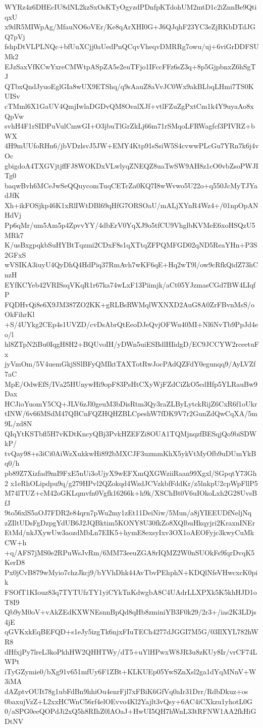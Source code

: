 WYRz4z6DHEcIU8dNL2kzSxOsKTyOgyzdPDnfpKTdohUM2mtD1c2iZnnBe9QtiqxU
x9dR5MIWpAg/MfauNO6oVEr/Ke8qArXHI0G+J6QJqhF23YC3eZjRKbDTdJGQ7pVj
fshpDtVLPLNQc+bfUuXCjj0aUedPnQCqvVheqvDMRRg7owu/uj+6viGrDDFSUMk2
EJzSaxVfKCwYxreCMWtpASpZA5e2euTFjo1IFccFFz6sZ3q+8p5GjpbnxZ6hSgTJ
QTbxQndJyuoEglGIa8wUX9ETShq/q9sAauZ8aVvJC0Wx9akBLbqLHmi7TS0KUISv
cTMml6X1GaUV4QmjIwlaDGDvQM8OealXJf+vtlFZuZgPxtCm1k4Y9uyaAo8xQpVw
svhH4F1rSIDPuVulCmwGI+O3jbuTlGrZkLj66m71rSMqoLFRWagfcf3PIVRZ+bWX
4H9mUUfoRHn6/jbVDzlsvJ5JW+EMY4Ktp91sSsiW5S4cvwwPLcGu7YRn7k6j4vOc
gbigdoA4TXGVjtjffFJ8WOKDxVLwlyqZNEQZ8uaTwSW9AH8z1cO0vbZsoPWJITg0
baqwBvh6MCeJwSeQQuycomTuqCETcZa0KQ7I8wWvwo5U22o+q550JcMyTJYadJfK
Xh+ikFOSjkp46K1xRlIWtDBl69qHfG7ORSOaU/mALjXYnR4Wz4+/01npOpANHdVj
Pp6qMr/um5Am5p4ZpvvYY/4dbErV0YqXJ9o5tfCU9VhglbKVMeE6xoHSQzU5MRk7
K/usBxgpqkbSuHYBtTqzmi2CDxF8s1qXTtqZFPQMFGD02qND5ReaYHn+P3S2GFxS
wVSIKA3iuyU4QyDhQ4HdPiq37RmAvh7wKF6qE+Hq2wT9l/ow9cRfkQidZ73hCnzH
EYfKCYeb42VRISsqVKqR1r67ka74wLxF13Piimjk/aCt05YJzmasCGd7BW4LIqfP
FQDHvQi8e6X9JM387ZO2KK+gRLBsRWMqlWXNXD2AuG8A0ZrFBvnMsS/oOkFihrKl
+S/4UYkg2CEp4s1UVZD/cvDsAbrQtEeoDJeQvjOFWu40MI+Nl6NvTb9PpJd4eo/l
hl8ZTpN2iBu0IqgH8H2+BQUvoIH/yDWn5uiESBdlHIidgD/EC9JCCYW2rceetuFx
jyVmOm/5V4uemGkjSSlBFyQMIktTAXTotRwJocPAdQZFdY0egunqq9/AyLVZf7aC
MpE/OdwEfS/IVa25HUnywHi9opF83PsHtCXyWjFZdCiZkO5cdHfp5YLRauBw9Dax
HCJioYuomY5CQ+JLV6zJl0geuM3bDisRtm3Qy3raZLByLytckRijZ6CxR6f1oUkr
tINW/6v66MSdM47QBCnFQZHQHZBLCpeshW7fDK9V7r2GunZdQwCqXA/5m9L/zd8N
QIqYtKSTbfl5H7vKDtKncyQBj3PvkHZEFZi8OUA1TQMjnqzfBESqjQo9biSDWkP/
tvQay98+s3iCi0AiWzXukkwHi892bMXCJF3uzmmKhX5ykVtMyOfb9uDUmYkBq0/h
pb89Z7Xizfad9mI9FxE5nUi3oUjyX9wEFXmQXGWziiRaan99Xgxl/SGpqtY73Gh2
x1eRhOLipdpu9q/g279HPvl2QZokqd4WzdJCVzkbfFddKr/z5lnkpU2cpWpFllP5
M74lTUZ+cM42oGKLqmvfn0Vgfk16266k+h9k/XSChBt0V6uIOkoLxh2G28UvsBfJ
9to56xlS5aOJ7FDR2e84qrn7pWu2my1zEt11DeiNiw/5Mun/a8jYIEEUDfNeljNq
zZIltUDsFgDzpgYdUB6J2JQBktim5KONY8U30fkZo8XQlbuHkqyjri2KraxnINEr
EtMd/nkJXywUw3aozdMbLn7EIK5+hymE8exsyIxv3OX1oAEOFyjc3kwyCuMkCW+h
+q/AFS7jMS0e2RPuWsJvRm/6MM73eeuZGA8rIQMZ2W0nSUOkFs9fqrDvqK5KerD8
Px0jCvB879wMyio7chzJkcj9/bYVhDhk44AvTbvPEhphN+KDQlNfeVHwcxcK0pik
FSOfT1KIouz83q7TYTUfzTY1yiCYkTnKdwgbA8C4UAdrLLXPXk5K5khHJD1oT8I9
Qb9yM0oV+vAkZEdKXWNEsnnBpQd8qHb8zminiYB3F0k29/2r3+/ias2K3LDjs4jE
qGVKxkEqBEFQD+s1eJy5izgTk6njxFIuTECh4277dJGGI7M5G/03IlXYL782hWR8
dHfxjPy7lreL3koPkhHW2QHHTWy/dT5+uYlHPwxW8JR3u8zKUy8Ir/vrCF74LWPt
iTyGZymie0/bXg91v651mfUy6F1ZBt+KLKUEp05YwSZnXsl2ga1dYqMNnV+W3iMA
dAZptvOUIt78g1ubFdBn9hhiOu4enrFjl7xFBiK6GfVq0aIr31Drr/RdbDkuz+os
0baxujVzZ+L2xxHCWnC56rf4elOEvvo4Kl2Yajlt3vQsy+6AC4iCXkzu1yhotL0G
0/aSPG0eeQOPdJi2xQ5h8RIhZ0lAOaJ+HwUI5QH7hWnL33tRFNW1AA2fkHiGDtNV
